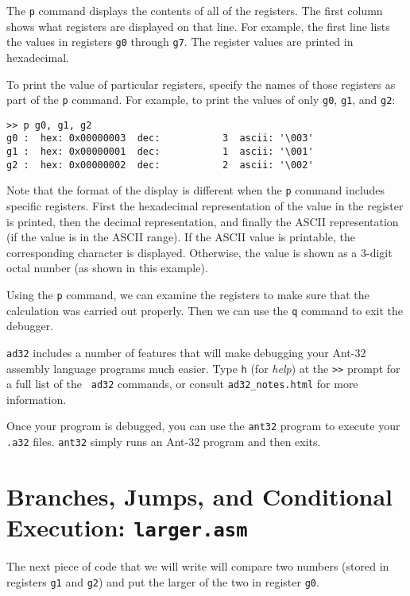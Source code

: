 The {\tt p} command displays the contents of all of the registers. 
The first column shows what registers are displayed on that line.  For
example, the first line lists the values in registers {\tt g0} through
{\tt g7}.  The register values are printed in hexadecimal.

To print the value of particular registers, specify the names of those
registers as part of the {\tt p} command.  For example, to print the
values of only {\tt g0}, {\tt g1}, and {\tt g2}:

{\codesize
\begin{verbatim}
>> p g0, g1, g2
g0 :  hex: 0x00000003  dec:           3  ascii: '\003'
g1 :  hex: 0x00000001  dec:           1  ascii: '\001'  
g2 :  hex: 0x00000002  dec:           2  ascii: '\002'
\end{verbatim}}

Note that the format of the display is different when the {\tt p}
command includes specific registers.  First the hexadecimal
representation of the value in the register is printed, then the
decimal representation, and finally the {\sc ASCII} representation (if
the value is in the ASCII range).  If the {\sc ASCII} value is
printable, the corresponding character is displayed.  Otherwise, the
value is shown as a 3-digit octal number (as shown in this example).

Using the {\tt p} command, we can examine the registers to make sure
that the calculation was carried out properly.  Then we can use the
{\tt q} command to exit the debugger.

{\tt ad32} includes a number of features that will make debugging your
Ant-32 assembly language programs much easier.  Type {\tt h}
(for {\em help}) at the {\tt >>} prompt for a full list of the {\tt
ad32} commands, or consult {\tt ad32\_notes.html} for more information.


Once your program is debugged, you can use the {\tt ant32} program to
execute your {\tt .a32} files.  {\tt ant32} simply runs an Ant-32
program and then exits.

\section{Branches, Jumps, and Conditional Execution: {\tt larger.asm}}

The next piece of code that we will write will compare two numbers
(stored in registers {\tt g1} and {\tt g2}) and put the larger of the
two in register {\tt g0}.

